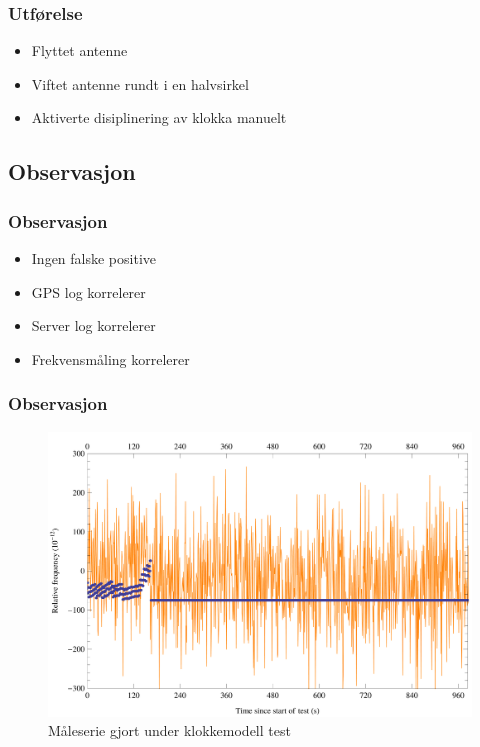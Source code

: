\documentclass[xcolor=table]{beamer}
\begin{document}
\begin{frame}
\frametitle{Utførelse}
      \begin{itemize}
        \item Flyttet antenne 
        \item Viftet antenne rundt i en halvsirkel
        \item Aktiverte disiplinering av klokka manuelt
      \end{itemize}
\end{frame}

\begin{frame}
\subsection{Observasjon}
\frametitle{Observasjon}
      \begin{itemize}
        \item Ingen falske positive
        \item GPS log korrelerer
        \item Server log korrelerer
        \item Frekvensmåling korrelerer
      \end{itemize}
\end{frame}

\begin{frame}
\frametitle{Observasjon}
      \begin{figure}
        \includegraphics[scale=0.70]{thesis/graphics/20161024-test2-telemetry-and-cnt91-combined-1-2.png}
        \caption{Måleserie gjort under klokkemodell test}
      \end{figure}
\end{frame}
\end{document}
